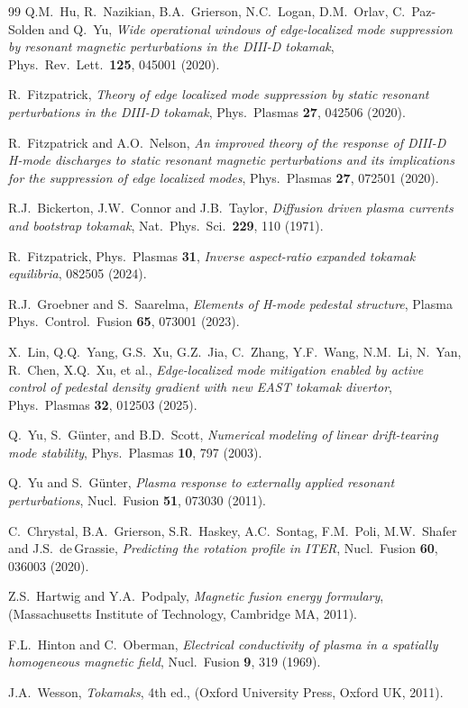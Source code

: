\documentclass[12pt,prb,aps]{revtex4-1}
\begin{document}
\begin{thebibliography}{99}
  Q.M.~Hu, R.~Nazikian, B.A.~Grierson, N.C.~Logan, D.M.~Orlav, C.~Paz-Solden and Q.~Yu, {\em Wide operational windows
 of edge-localized mode suppression by resonant magnetic perturbations in the DIII-D tokamak}, Phys.\ Rev.\ Lett.\ {\bf 125}, 045001 (2020).
 
 R.~Fitzpatrick, {\em Theory of edge localized mode suppression by static resonant perturbations in the DIII-D tokamak}, Phys.\ Plasmas {\bf 27}, 042506 (2020).

 R.~Fitzpatrick and A.O.~Nelson, 
{\em An improved theory of the response of DIII-D H-mode discharges to static resonant magnetic perturbations and its implications for the suppression of edge localized modes},
Phys.\   Plasmas {\bf 27}, 072501 (2020).

 R.J.~Bickerton, J.W.~Connor and J.B.~Taylor, {\em Diffusion driven plasma currents and bootstrap tokamak}, Nat.\ Phys.\ Sci.\  {\bf 229}, 110 (1971). 

 R.~Fitzpatrick, Phys.\ Plasmas {\bf 31},  {\em Inverse aspect-ratio expanded tokamak equilibria}, 082505 (2024).

 R.J.~Groebner and S.~Saarelma, {\em Elements of H-mode pedestal structure}, Plasma Phys.\ Control.\ Fusion {\bf 65}, 073001 (2023). 

 X.~Lin, Q.Q.~Yang, G.S.~Xu,  G.Z.~Jia, C.~Zhang, Y.F.~Wang,  N.M.~Li, N.~Yan, 
R.~Chen, X.Q.~Xu, et al., {\em Edge-localized mode mitigation enabled by active control of pedestal density gradient with new EAST tokamak divertor}, 
Phys.\ Plasmas {\bf 32}, 012503 (2025).

 Q.~Yu, S.~G\"{u}nter, and B.D.~Scott, {\em Numerical modeling of linear drift-tearing mode stability}, Phys.\ Plasmas {\bf 10}, 797 (2003). 

 Q.~Yu and S.~G\"{u}nter, {\em Plasma response to externally applied resonant perturbations}, Nucl.\ Fusion {\bf 51}, 
073030 (2011).

 C.~Chrystal, B.A.~Grierson, S.R.~Haskey, A.C.~Sontag, F.M.~Poli, M.W.~Shafer and J.S.~de\,Grassie, {\em Predicting the rotation profile in ITER},  Nucl.\ Fusion {\bf 60}, 036003 (2020). 

 Z.S.~Hartwig and Y.A.~Podpaly, {\em Magnetic fusion energy formulary}, (Massachusetts Institute of Technology, Cambridge MA, 2011). 

 F.L.~Hinton and C.~Oberman, {\em Electrical conductivity of plasma in a spatially homogeneous magnetic field}, Nucl.\ Fusion {\bf 9}, 319 (1969). 

  J.A.~Wesson, {\em Tokamaks}, 4th ed., (Oxford University Press, Oxford UK, 2011). 

\end{thebibliography}
\end{document}
